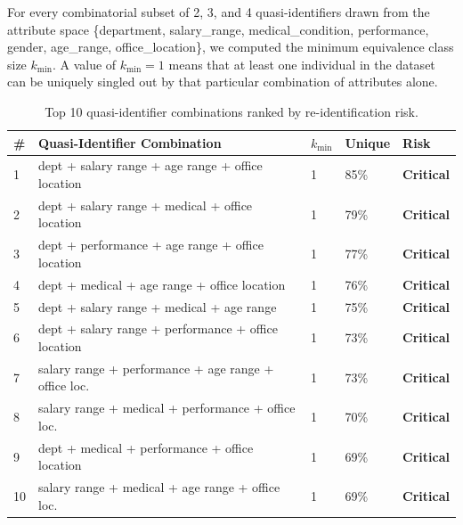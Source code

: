 \documentclass[12pt, a4paper]{article}
\begin{document}
For every combinatorial subset of 2, 3, and 4 quasi-identifiers drawn from the attribute space \{department, salary\_range, medical\_condition, performance, gender, age\_range, office\_location\}, we computed the minimum equivalence class size $k_{\min}$. A value of $k_{\min} = 1$ means that at least one individual in the dataset can be uniquely singled out by that particular combination of attributes alone.

\begin{table}[H]
\centering
\caption{Top 10 quasi-identifier combinations ranked by re-identification risk.}
\label{tab:kanon}
\footnotesize
{}
\begin{tabular}{C{0.6cm} L{7cm} C{0.8cm} C{1.3cm} C{1.3cm}}
\toprule
{}
\color{white}\textbf{\#} &
\color{white}\textbf{Quasi-Identifier Combination} &
\color{white}\textbf{$k_{\min}$} &
\color{white}\textbf{Unique} &
\color{white}\textbf{Risk} \\
  & dept + salary range + age range + office location        & 1 & 85\% & \textcolor{accent}{\textbf{Critical}} \\
2  & dept + salary range + medical + office location           & 1 & 79\% & \textcolor{accent}{\textbf{Critical}} \\
3  & dept + performance + age range + office location          & 1 & 77\% & \textcolor{accent}{\textbf{Critical}} \\
4  & dept + medical + age range + office location              & 1 & 76\% & \textcolor{accent}{\textbf{Critical}} \\
5  & dept + salary range + medical + age range                 & 1 & 75\% & \textcolor{accent}{\textbf{Critical}} \\
6  & dept + salary range + performance + office location       & 1 & 73\% & \textcolor{accent}{\textbf{Critical}} \\
7  & salary range + performance + age range + office loc.      & 1 & 73\% & \textcolor{accent}{\textbf{Critical}} \\
8  & salary range + medical + performance + office loc.        & 1 & 70\% & \textcolor{accent}{\textbf{Critical}} \\
9  & dept + medical + performance + office location            & 1 & 69\% & \textcolor{accent}{\textbf{Critical}} \\
10 & salary range + medical + age range + office loc.          & 1 & 69\% & \textcolor{accent}{\textbf{Critical}} \\
\bottomrule
\end{tabular}
\end{table}
\end{document}
